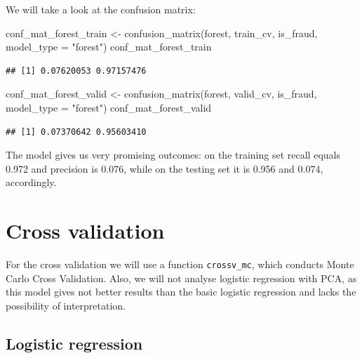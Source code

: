 \documentclass[
]{report}
\newenvironment{Shaded}{\begin{snugshade}}{\end{snugshade}}
\newcommand{\AttributeTok}[1]{\textcolor[rgb]{0.77,0.63,0.00}{#1}}
\newcommand{\FunctionTok}[1]{\textcolor[rgb]{0.00,0.00,0.00}{#1}}
\newcommand{\NormalTok}[1]{#1}
\newcommand{\OtherTok}[1]{\textcolor[rgb]{0.56,0.35,0.01}{#1}}
\newcommand{\StringTok}[1]{\textcolor[rgb]{0.31,0.60,0.02}{#1}}
\begin{document}
We will take a look at the confusion matrix:

\begin{Shaded}
\begin{Highlighting}[]
\NormalTok{conf\_mat\_forest\_train }\OtherTok{\textless{}{-}} \FunctionTok{confusion\_matrix}\NormalTok{(forest, train\_cv, }\StringTok{\textquotesingle{}is\_fraud\textquotesingle{}}\NormalTok{, }\AttributeTok{model\_type =} \StringTok{"forest"}\NormalTok{)}
\NormalTok{conf\_mat\_forest\_train}
\end{Highlighting}
\end{Shaded}

\begin{verbatim}
## [1] 0.07620053 0.97157476
\end{verbatim}

\begin{Shaded}
\begin{Highlighting}[]
\NormalTok{conf\_mat\_forest\_valid }\OtherTok{\textless{}{-}} \FunctionTok{confusion\_matrix}\NormalTok{(forest, valid\_cv, }\StringTok{\textquotesingle{}is\_fraud\textquotesingle{}}\NormalTok{, }\AttributeTok{model\_type =} \StringTok{"forest"}\NormalTok{)}
\NormalTok{conf\_mat\_forest\_valid}
\end{Highlighting}
\end{Shaded}

\begin{verbatim}
## [1] 0.07370642 0.95603410
\end{verbatim}

The model gives us very promising outcomes: on the training set recall
equals 0.972 and precision is 0.076, while on the testing set it is
0.956 and 0.074, accordingly.

\hypertarget{cross-validation-1}{%
\chapter{Cross validation}\label{cross-validation-1}}

For the cross validation we will use a function \texttt{crossv\_mc},
which conducts Monte Carlo Cross Validation. Also, we will not analyse
logistic regression with PCA, as this model gives not better results
than the basic logistic regression and lacks the possibility of
interpretation.

\hypertarget{logistic-regression-1}{%
\section{Logistic regression}\label{logistic-regression-1}}
\end{document}
